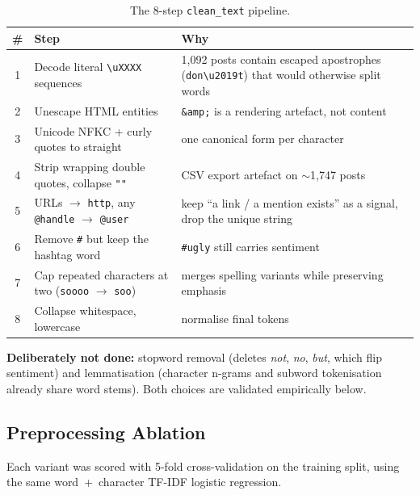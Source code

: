\documentclass[11pt,a4paper]{article}
\begin{document}
\begin{table}[H]
\centering
\small
\begin{tabular}{@{}clp{8.2cm}@{}}
\toprule
\textbf{\#} & \textbf{Step} & \textbf{Why} \\
\midrule
1 & Decode literal \texttt{\textbackslash uXXXX} sequences & 1{,}092 posts contain escaped apostrophes (\texttt{don\textbackslash u2019t}) that would otherwise split words \\
2 & Unescape HTML entities & \texttt{\&amp;} is a rendering artefact, not content \\
3 & Unicode NFKC + curly quotes to straight & one canonical form per character \\
4 & Strip wrapping double quotes, collapse \texttt{""} & CSV export artefact on $\sim$1{,}747 posts \\
5 & URLs $\to$ \texttt{http}, any \texttt{@handle} $\to$ \texttt{@user} & keep ``a link / a mention exists'' as a signal, drop the unique string \\
6 & Remove \texttt{\#} but keep the hashtag word & \texttt{\#ugly} still carries sentiment \\
7 & Cap repeated characters at two (\texttt{soooo} $\to$ \texttt{soo}) & merges spelling variants while preserving emphasis \\
8 & Collapse whitespace, lowercase & normalise final tokens \\
\bottomrule
\end{tabular}
\caption{The 8-step \texttt{clean\_text} pipeline.}
\end{table}

\textbf{Deliberately not done:} stopword removal (deletes \textit{not}, \textit{no}, \textit{but}, which flip sentiment) and lemmatisation (character n-grams and subword tokenisation already share word stems). Both choices are validated empirically below.

\subsection{Preprocessing Ablation}

Each variant was scored with 5-fold cross-validation on the training split, using the same word~+~character TF-IDF logistic regression.
\end{document}
